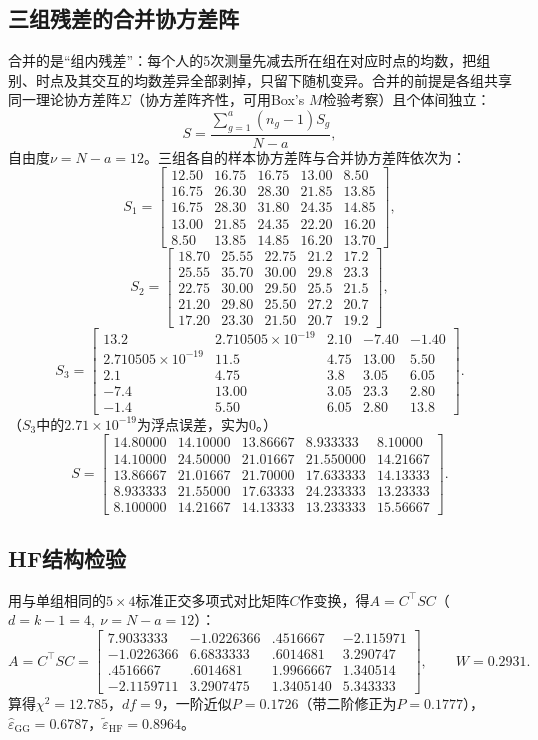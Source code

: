 \subsection{三组残差的合并协方差阵}\label{sec:pool}
合并的是“组内残差”：每个人的5次测量先减去所在组在对应时点的均数，把组别、时点及其交互的均数差异全部剥掉，只留下随机变异。合并的前提是各组共享同一理论协方差阵$\Sigma$（协方差阵齐性，可用Box's $M$检验考察）且个体间独立：
\[
S=\frac{\sum_{g=1}^a(n_g-1)S_g}{N-a},
\]
自由度$\nu=N-a=12$。三组各自的样本协方差阵与合并协方差阵依次为：
\[
S_1=\begin{bmatrix}
12.50&16.75&16.75&13.00&8.50\\
16.75&26.30&28.30&21.85&13.85\\
16.75&28.30&31.80&24.35&14.85\\
13.00&21.85&24.35&22.20&16.20\\
8.50&13.85&14.85&16.20&13.70
\end{bmatrix},
\]
\[
S_2=\begin{bmatrix}
18.70&25.55&22.75&21.2&17.2\\
25.55&35.70&30.00&29.8&23.3\\
22.75&30.00&29.50&25.5&21.5\\
21.20&29.80&25.50&27.2&20.7\\
17.20&23.30&21.50&20.7&19.2
\end{bmatrix},
\]
\[
S_3=\begin{bmatrix}
13.2&2.710505\times10^{-19}&2.10&-7.40&-1.40\\
2.710505\times10^{-19}&11.5&4.75&13.00&5.50\\
2.1&4.75&3.8&3.05&6.05\\
-7.4&13.00&3.05&23.3&2.80\\
-1.4&5.50&6.05&2.80&13.8
\end{bmatrix}.
\]
（$S_3$中的$2.71\times10^{-19}$为浮点误差，实为0。）
\[
S=\begin{bmatrix}
14.80000&14.10000&13.86667&8.933333&8.10000\\
14.10000&24.50000&21.01667&21.550000&14.21667\\
13.86667&21.01667&21.70000&17.633333&14.13333\\
8.933333&21.55000&17.63333&24.233333&13.23333\\
8.100000&14.21667&14.13333&13.233333&15.56667
\end{bmatrix}.
\]
\subsection{HF结构检验}
用与单组相同的$5\times 4$标准正交多项式对比矩阵$C$作变换，得$A=C^\top SC$（$d=k-1=4,\ \nu=N-a=12$）：
\[
A=C^\top SC=\begin{bmatrix}
7.9033333&-1.0226366&.4516667&-2.115971\\
-1.0226366&6.6833333&.6014681&3.290747\\
.4516667&.6014681&1.9966667&1.340514\\
-2.1159711&3.2907475&1.3405140&5.343333
\end{bmatrix},\qquad W=0.2931.
\]
算得$\chi^2=12.785$，$df=9$，一阶近似$P=0.1726$（带二阶修正为$P=0.1777$），$\widehat\varepsilon_{\mathrm{GG}}=0.6787$，$\widetilde\varepsilon_{\mathrm{HF}}=0.8964$。
